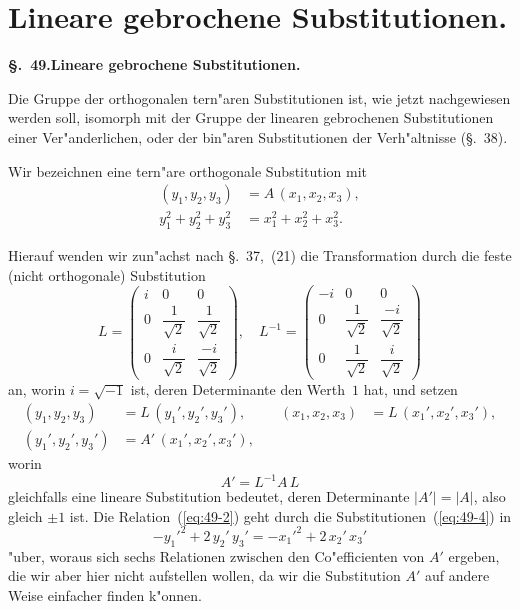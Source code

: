 \documentclass[12pt,a4paper]{article}
\theoremstyle{definition}
\begin{document}
\section{Lineare gebrochene Substitutionen.}\label{sec:49}

\noindent\textbf{\S.~49.}\quad\textbf{Lineare gebrochene Substitutionen.}
\vspace{0.3cm}

Die Gruppe der orthogonalen tern"aren Substitutionen ist, wie jetzt nachgewiesen werden soll, isomorph mit der Gruppe der linearen gebrochenen Substitutionen einer Ver"anderlichen, oder der bin"aren Substitutionen der Verh"altnisse (\S.~38).

Wir bezeichnen eine tern"are orthogonale Substitution mit
\begin{align}
(y_1, y_2, y_3) &= A\,(x_1, x_2, x_3), \label{eq:49-1}\\
y_1^2 + y_2^2 + y_3^2 &= x_1^2 + x_2^2 + x_3^2. \label{eq:49-2}
\end{align}

Hierauf wenden wir zun"achst nach \S.~37,~(21) die Transformation durch die feste (nicht orthogonale) Substitution
\begin{equation}\label{eq:49-3}
L = \begin{pmatrix}
i & 0 & 0 \\[4pt]
0 & \dfrac{1}{\sqrt{2}} & \dfrac{1}{\sqrt{2}} \\[8pt]
0 & \dfrac{i}{\sqrt{2}} & \dfrac{-i}{\sqrt{2}}
\end{pmatrix},
\quad
L^{-1} = \begin{pmatrix}
-i & 0 & 0 \\[4pt]
0 & \dfrac{1}{\sqrt{2}} & \dfrac{-i}{\sqrt{2}} \\[8pt]
0 & \dfrac{1}{\sqrt{2}} & \dfrac{i}{\sqrt{2}}
\end{pmatrix}
\end{equation}
an, worin $i = \sqrt{-1}$ ist, deren Determinante den Werth~$1$ hat, und setzen
\begin{align}
(y_1, y_2, y_3) &= L\,(y_1', y_2', y_3'), &\quad
(x_1, x_2, x_3) &= L\,(x_1', x_2', x_3'), \label{eq:49-4}\\
(y_1', y_2', y_3') &= A'\,(x_1', x_2', x_3'), \label{eq:49-5}
\end{align}
worin
\begin{equation}\label{eq:49-6}
A' = L^{-1} A\,L
\end{equation}
gleichfalls eine lineare Substitution bedeutet, deren Determinante $|A'| = |A|$, also gleich $\pm 1$ ist. Die Relation~(\ref{eq:49-2}) geht durch die Substitutionen~(\ref{eq:49-4}) in
\begin{equation}\label{eq:49-7}
-y_1'^2 + 2\,y_2'\,y_3' = -x_1'^2 + 2\,x_2'\,x_3'
\end{equation}
"uber, woraus sich sechs Relationen zwischen den Co"efficienten von $A'$ ergeben, die wir aber hier nicht aufstellen wollen, da wir die Substitution $A'$ auf andere Weise einfacher finden k"onnen.
\end{document}
